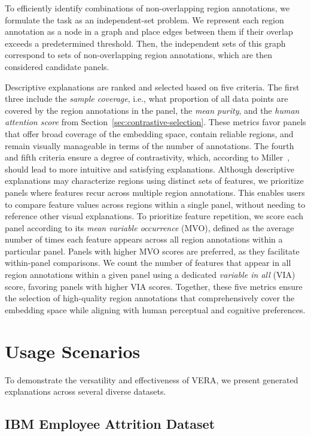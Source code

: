 \documentclass[lettersize,journal]{IEEEtran}
\begin{document}
To efficiently identify combinations of non-overlapping region annotations, we formulate the task as an independent-set problem. We represent each region annotation as a node in a graph and place edges between them if their overlap exceeds a predetermined threshold. Then, the independent sets of this graph correspond to sets of non-overlapping region annotations, which are then considered candidate panels.

Descriptive explanations are ranked and selected based on five criteria.
The first three include the \textit{sample coverage}, i.e., what proportion of all data points are covered by the region annotations in the panel, the \textit{mean purity}, and the \textit{human attention score} from Section~\ref{sec:contrastive-selection}.
These metrics favor panels that offer broad coverage of the embedding space, contain reliable regions, and remain visually manageable in terms of the number of annotations.
The fourth and fifth criteria ensure a degree of contrastivity, which, according to Miller~\cite{Miller2019}, should lead to more intuitive and satisfying explanations.
Although descriptive explanations may characterize regions using distinct sets of features, we prioritize panels where features recur across multiple region annotations. This enables users to compare feature values across regions within a single panel, without needing to reference other visual explanations.
To prioritize feature repetition, we score each panel according to its \textit{mean variable occurrence} (MVO), defined as the average number of times each feature appears across all region annotations within a particular panel.
Panels with higher MVO scores are preferred, as they facilitate within-panel comparisons.
We count the number of features that appear in all region annotations within a given panel using a dedicated \textit{variable in all} (VIA) score, favoring panels with higher VIA scores.
Together, these five metrics ensure the selection of high-quality region annotations that comprehensively cover the embedding space while aligning with human perceptual and cognitive preferences.

\section{Usage Scenarios}
\label{sec:case-studies}

To demonstrate the versatility and effectiveness of VERA, we present generated explanations across several diverse datasets.

\subsection{IBM Employee Attrition Dataset}
\end{document}
